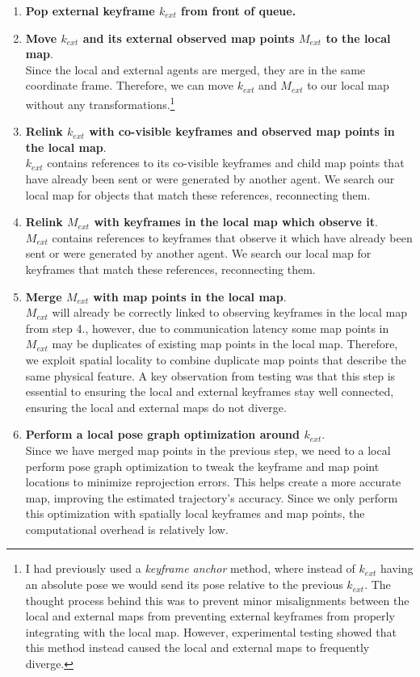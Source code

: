 \begin{enumerate}
    \item \textbf{Pop external keyframe $k_{ext}$ from front of queue.}
    \item \textbf{Move $k_{ext}$ and its external observed map points $M_{ext}$ to the local map}. \\
          Since the local and external agents are merged, they are in the same coordinate frame. Therefore, we can move $k_{ext}$ and $M_{ext}$ to our local map without any transformations.\footnote[1]{I had previously used a \textit{keyframe anchor} method, where instead of $k_{ext}$ having an absolute pose we would send its pose relative to the previous $k_{ext}$. The thought process behind this was to prevent minor misalignments between the local and external maps from preventing external keyframes from properly integrating with the local map. However, experimental testing showed that this method instead caused the local and external maps to frequently diverge.}
    \item \textbf{Relink $k_{ext}$ with co-visible keyframes and observed map points in the local map}. \\
          $k_{ext}$ contains references to its co-visible keyframes and child map points that have already been sent or were generated by another agent. We search our local map for objects that match these references, reconnecting them.
    \item \textbf{Relink $M_{ext}$ with keyframes in the local map which observe it}. \\
          $M_{ext}$ contains references to keyframes that observe it which have already been sent or were generated by another agent. We search our local map for keyframes that match these references, reconnecting them.
    \item \textbf{Merge $M_{ext}$ with map points in the local map}. \\
          $M_{ext}$ will already be correctly linked to observing keyframes in the local map from step 4., however, due to communication latency some map points in $M_{ext}$ may be duplicates of existing map points in the local map. Therefore, we exploit spatial locality to combine duplicate map points that describe the same physical feature. A key observation from testing was that this step is essential to ensuring the local and external keyframes stay well connected, ensuring the local and external maps do not diverge.
    \item \textbf{Perform a local pose graph optimization around $k_{ext}$}. \\
          Since we have merged map points in the previous step, we need to a local perform pose graph optimization to tweak the keyframe and map point locations to minimize reprojection errors. This helps create a more accurate map, improving the estimated trajectory's accuracy. Since we only perform this optimization with spatially local keyframes and map points, the computational overhead is relatively low.
\end{enumerate}


